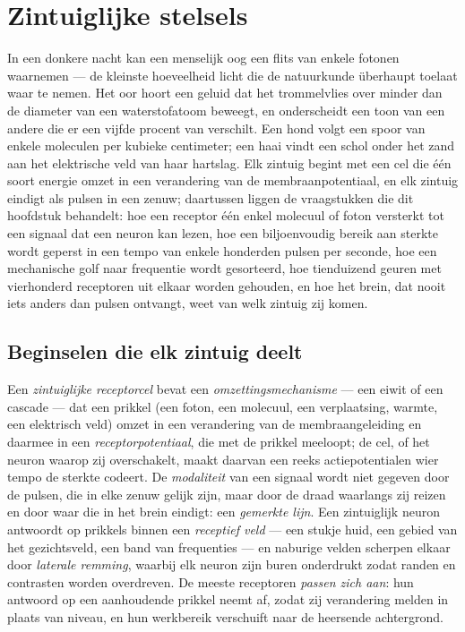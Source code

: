 \chapter{Zintuiglijke stelsels}\label{ch:b3:sensory-systems}

In een donkere nacht kan een menselijk oog een flits van enkele fotonen
waarnemen --- de kleinste hoeveelheid licht die de natuurkunde
überhaupt toelaat waar te nemen. Het oor hoort een geluid dat het
trommelvlies over minder dan de diameter van een waterstofatoom
beweegt, en onderscheidt een toon van een andere die er een vijfde
procent van verschilt. Een hond volgt een spoor van enkele moleculen
per kubieke centimeter; een haai vindt een schol onder het zand aan het
elektrische veld van haar hartslag. Elk zintuig begint met een cel die
één soort energie omzet in een verandering van de membraanpotentiaal,
en elk zintuig eindigt als pulsen in een zenuw; daartussen liggen de
vraagstukken die dit hoofdstuk behandelt: hoe een receptor één enkel
molecuul of foton versterkt tot een signaal dat een neuron kan lezen,
hoe een biljoenvoudig bereik aan sterkte wordt geperst in een tempo van
enkele honderden pulsen per seconde, hoe een mechanische golf naar
frequentie wordt gesorteerd, hoe tienduizend geuren met vierhonderd
receptoren uit elkaar worden gehouden, en hoe het brein, dat nooit iets
anders dan pulsen ontvangt, weet van welk zintuig zij komen.

\section{Beginselen die elk zintuig deelt}

\begin{definition}\label{def:b3:sensory-systems:principles}
Een \emph{zintuiglijke receptorcel} bevat een
\emph{omzettingsmechanisme} --- een eiwit of een cascade --- dat een
prikkel (een foton, een molecuul, een verplaatsing, warmte, een
elektrisch veld) omzet in een verandering van de membraangeleiding en
daarmee in een \emph{receptorpotentiaal}, die met de prikkel meeloopt;
de cel, of het neuron waarop zij overschakelt, maakt daarvan een reeks
actiepotentialen wier tempo de sterkte codeert. De \emph{modaliteit}
van een signaal wordt niet gegeven door de pulsen, die in elke zenuw
gelijk zijn, maar door de draad waarlangs zij reizen en door waar die
in het brein eindigt: een \emph{gemerkte lijn}. Een zintuiglijk neuron
antwoordt op prikkels binnen een \emph{receptief veld} --- een stukje
huid, een gebied van het gezichtsveld, een band van frequenties --- en
naburige velden scherpen elkaar door \emph{laterale remming}, waarbij
elk neuron zijn buren onderdrukt zodat randen en contrasten worden
overdreven. De meeste receptoren \emph{passen zich aan}: hun antwoord
op een aanhoudende prikkel neemt af, zodat zij verandering melden in
plaats van niveau, en hun werkbereik verschuift naar de heersende
achtergrond.
\end{definition}

